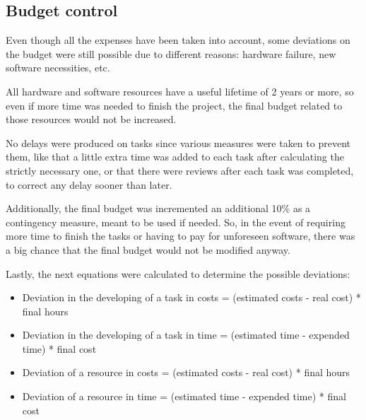 \subsection{Budget control}
\label{ssec:budgetControl}
Even though all the expenses have been taken into account, some deviations on the budget were still possible due to different reasons: hardware failure, new software necessities, etc.

All hardware and software resources have a useful lifetime of 2 years or more, so even if more time was needed to finish the project, the final budget related to those resources would not be increased.

No delays were produced on tasks since various measures were taken to prevent them,  like that a little extra time was added to each task after calculating the strictly necessary one, or that there were reviews after each task was completed, to correct any delay sooner than later.

Additionally, the final budget was incremented an additional 10\% as a contingency measure, meant to be used if needed. So, in the event of requiring more time to finish the tasks or having to pay for unforeseen software, there was a big chance that the final budget would not be modified anyway.

Lastly, the next equations were calculated to determine the possible deviations:
\begin{itemize}
\item Deviation in the developing of a task in costs = (estimated costs - real cost) * final hours
\item Deviation in the developing of a task in time = (estimated time - expended time) * final cost
\item Deviation of a resource in costs = (estimated costs - real cost) * final hours
\item Deviation of a resource in time = (estimated time - expended time) * final cost
\end{itemize}